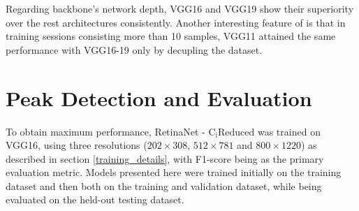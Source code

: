 Regarding backbone's network depth, VGG16 and VGG19 show their superiority over the rest architectures consistently. Another interesting feature of  is that in training sessions consisting more than 10 samples, VGG11 attained the same performance with VGG16-19 only by decupling the dataset.

\section{Peak Detection and Evaluation}
To obtain maximum performance, RetinaNet - $\text{C}_\text{i}\text{Reduced}$ was trained on VGG16, using three resolutions ($202\times308$, $512\times781$ and $800\times1220$) as described in section \ref{training_details}, with F1-score being as the primary evaluation metric. Models presented here were trained initially on the training dataset and then both on the training and validation dataset, while being evaluated on the held-out testing dataset.

\begin{savenotes}
\begin{table}[!htb]
  \centering
  \caption{Comparing performance of RetinaNet - $\text{C}_\text{i}\text{Reduced}$ (VGG16), trained on the training and on the combined training - validation set, with the state-of-the-art models. Parentheses indicate resolutions.}
  \label{tab6}
\end{table}
\end{savenotes}

